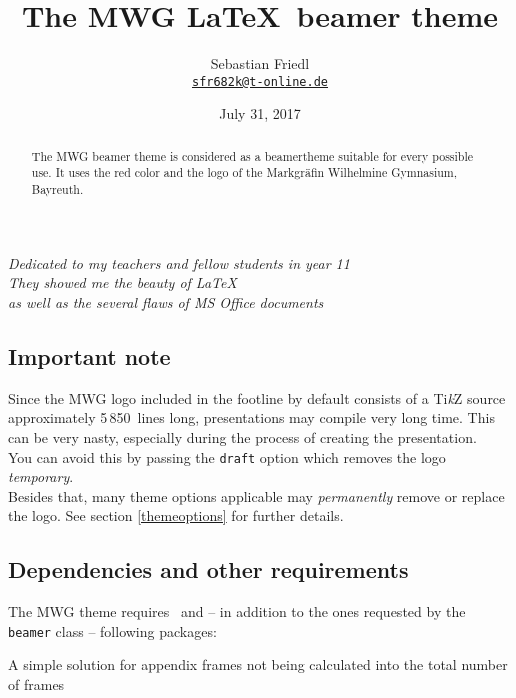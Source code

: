 \documentclass[11pt]{ltxdoc}
\title{The MWG \LaTeX\ beamer theme}
\author{Sebastian Friedl \\ \href{mailto:sfr682k@t-online.de}{\texttt{sfr682k@t-online.de}}}
\date{July 31, 2017}
\begin{document}
	\maketitle
	\thispagestyle{empty}
	

	\begin{center} \itshape
		Dedicated to my teachers and fellow students in year 11 \\[1.25\smallskipamount]
		They showed me the beauty of \LaTeX \\
		as well as the several flaws of MS Office documents
	\end{center}
	
	\medskip
	\begin{abstract}
		\hspace{-1.5em}%
		The MWG beamer theme is considered as a beamertheme suitable for every possible use. It uses the red color and the logo of the Markgräfin Wilhelmine Gymnasium, Bayreuth.
	\end{abstract}
	

	\tableofcontents

	\clearpage
	
	\subsection*{Important note}
	Since the MWG logo included in the footline by default consists of a Ti\textit{k}Z source approximately 5\,850~lines long, presentations may compile very long time. This can be very nasty, especially during the process of creating the presentation. \\
	You can avoid this by passing the \texttt{draft} option which removes the logo \emph{temporary}. \\
	Besides that, many theme options applicable may \emph{permanently} remove or replace the logo. See section \ref{themeoptions} for further details.
	
	
	\subsection*{Dependencies and other requirements}
	The MWG theme requires \LaTeXe\ and -- in addition to the ones requested by the \texttt{beamer} class -- following packages:
	
	\medskip
	A simple solution for appendix frames not being calculated into the total number of frames
	
\end{document}
